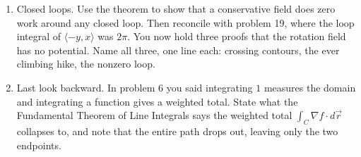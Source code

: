 \documentclass[12pt]{article}
\begin{document}
\begin{enumerate}
  \item Closed loops. Use the theorem to show that a conservative field does zero work around any closed loop. Then reconcile with problem 19, where the loop integral of $\langle -y, x \rangle$ was $2\pi$. You now hold three proofs that the rotation field has no potential. Name all three, one line each: crossing contours, the ever climbing hike, the nonzero loop.
  \item Last look backward. In problem 6 you said integrating $1$ measures the domain and integrating a function gives a weighted total. State what the Fundamental Theorem of Line Integrals says the weighted total $\int_C \nabla f \cdot d\vec r$ collapses to, and note that the entire path drops out, leaving only the two endpoints.
\end{enumerate}
\end{document}
